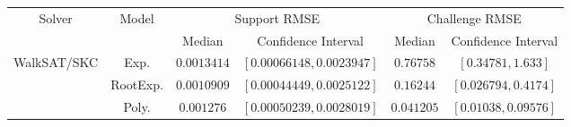 \begin{tabular}{cc|cc|cc} 
\hline 
 \multirow{2}{*}{Solver} & \multirow{2}{*}{Model} & \multicolumn{2}{c|}{Support RMSE}  & \multicolumn{2}{c}{Challenge RMSE} \tabularnewline & & Median & Confidence Interval & Median & Confidence Interval \tabularnewline\hline 
\hline 
\multirow{3}{*}{WalkSAT/SKC} & Exp. & $0.0013414$ & $\left[0.00066148,0.0023947\right]$ & $0.76758$ & $\left[0.34781,1.633\right]$ \tabularnewline 
 & RootExp. & $0.0010909$ & $\left[0.00044449,0.0025122\right]$ & $0.16244$ & $\left[0.026794,0.4174\right]$ \tabularnewline 
 & Poly. & $\mathbf{0.001276}$ & $\mathbf{\left[0.00050239,0.0028019\right]}$ & $\mathbf{0.041205}$ & $\mathbf{\left[0.01038,0.09576\right]}$ \tabularnewline 
\hline 
\end{tabular} 

